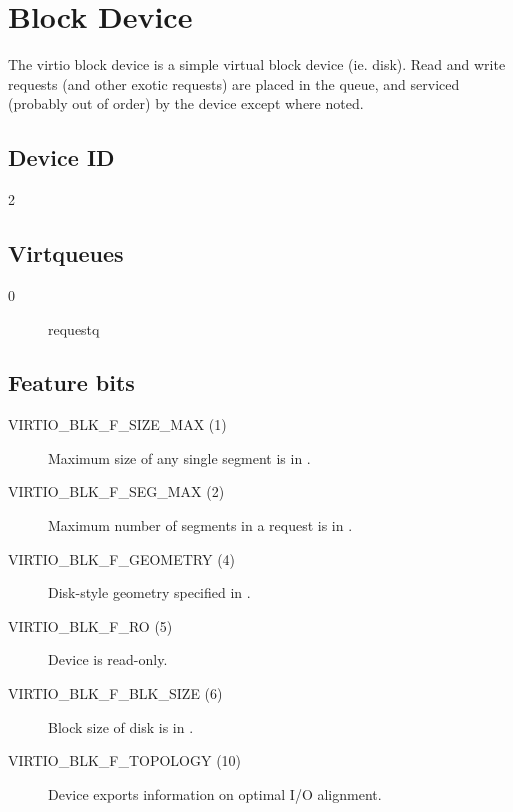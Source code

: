 \section{Block Device}\label{sec:Device Types / Block Device}

The virtio block device is a simple virtual block device (ie.
disk). Read and write requests (and other exotic requests) are
placed in the queue, and serviced (probably out of order) by the
device except where noted.

\subsection{Device ID}\label{sec:Device Types / Block Device / Device ID}
  2

\subsection{Virtqueues}\label{sec:Device Types / Block Device / Virtqueues}
\begin{description}
\item[0] requestq
\end{description}

\subsection{Feature bits}\label{sec:Device Types / Block Device / Feature bits}

\begin{description}
\item[VIRTIO_BLK_F_SIZE_MAX (1)] Maximum size of any single segment is
    in .

\item[VIRTIO_BLK_F_SEG_MAX (2)] Maximum number of segments in a
    request is in .

\item[VIRTIO_BLK_F_GEOMETRY (4)] Disk-style geometry specified in
    .

\item[VIRTIO_BLK_F_RO (5)] Device is read-only.

\item[VIRTIO_BLK_F_BLK_SIZE (6)] Block size of disk is in .

\item[VIRTIO_BLK_F_TOPOLOGY (10)] Device exports information on optimal I/O
    alignment.
\end{description}

